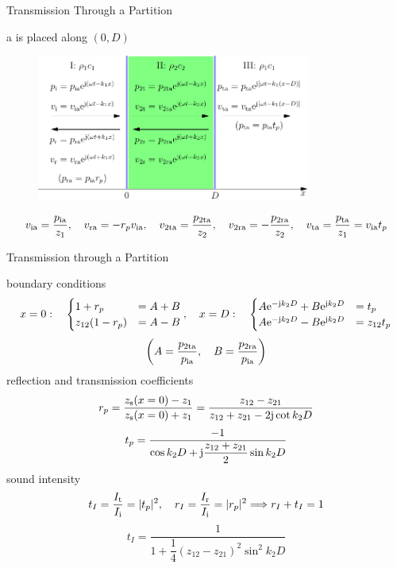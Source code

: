 \documentclass[9pt,mathserif]{beamer}
\let\emph\relax %
\begin{document}
\begin{frame}{Transmission Through a Partition}
	\begin{outline}
		\1 a \emph{partition} is placed along $(0,D)$
	\end{outline}
	\begin{figure}
		\centering
		\includegraphics[width=0.8\textwidth]{img/idealfluid/planeVertIncPartition.pdf}
	\end{figure}
	$$
	v\st{ia} = \frac{p\st{ia}}{z_1}\qc
	v\st{ra}=-r_pv\st{ia}\qc
	v\st{2ta} = \frac{p\st{2ta}}{z_2}\qc
	v\st{2ra} = -\frac{p\st{2ra}}{z_2}\qc
	v\st{ta} = \frac{p\st{ta}}{z_1} 
	=v\st{ia}t_p$$
\end{frame}

\begin{frame}{Transmission through a Partition}
	\begin{outline}
		\1 boundary conditions
		$$x = 0: \quad 
		\begin{cases}
			1+r_p &= A+B\\
			z_{12}(1-r_p) &= A-B	
		\end{cases}
		\qc
		x= D:\quad 
		\begin{cases}
			A\me^{-\mj k_2 D} +B\me^{\mj k_2D}&=t_p\\
			A\me^{-\mj k_2 D} -B\me^{\mj k_2D}&=z_{12}t_p
		\end{cases}
		$$
		$$\qty(
		A = \frac{p\st{2ta}}{p\st{ia}}
		\qc 
		B = \frac{p\st{2ra}}{p\st{ia}}
		)
		$$
		\1 reflection and transmission coefficients
		$$ r_p = \frac{z_\text{s}(x=0) - z_1}{z_\text{s}(x=0)+z_1}
		= \frac{z_{12}-z_{21}}{z_{12}+z_{21} -2\mathrm{j} \cot k_2 D}$$
		$$ t_p = \frac{-1}{\cos k_2 D + \mathrm{j} \dfrac{z_{12}+z_{21}}{2}
	\sin k_2 D}$$
		\1 sound intensity
		$$t_I = \frac{I\st{t}}{I\st{i}} = |t_p|^2\qc r_I = \frac{I\st{r}}{I\st{i}}
		 = |r_p|^2\imp r_I+t_I = 1 $$
		$$t_I = \frac{1}{1+\dfrac{1}{4} (z_{12}-z_{21})^2 \sin^2 k_2 D}$$
	\end{outline}
\end{frame}
\end{document}
